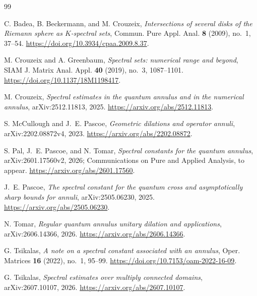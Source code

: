 \documentclass[11pt]{article}
\theoremstyle{definition}
\theoremstyle{remark}
\begin{document}
\begin{thebibliography}{99}

C. Badea, B. Beckermann, and M. Crouzeix,
\emph{Intersections of several disks of the Riemann sphere as
\(K\)-spectral sets},
Commun. Pure Appl. Anal. \textbf{8} (2009), no.~1, 37--54.
\url{https://doi.org/10.3934/cpaa.2009.8.37}.

M. Crouzeix and A. Greenbaum,
\emph{Spectral sets: numerical range and beyond},
SIAM J. Matrix Anal. Appl. \textbf{40} (2019), no.~3,
1087--1101.
\url{https://doi.org/10.1137/18M1198417}.

M. Crouzeix,
\emph{Spectral estimates in the quantum annulus and in the numerical
annulus},
arXiv:2512.11813, 2025.
\url{https://arxiv.org/abs/2512.11813}.

S. McCullough and J.~E. Pascoe,
\emph{Geometric dilations and operator annuli},
arXiv:2202.08872v4, 2023.
\url{https://arxiv.org/abs/2202.08872}.

S. Pal, J.~E. Pascoe, and N. Tomar,
\emph{Spectral constants for the quantum annulus},
arXiv:2601.17560v2, 2026; Communications on Pure and Applied
Analysis, to appear.
\url{https://arxiv.org/abs/2601.17560}.

J.~E. Pascoe,
\emph{The spectral constant for the quantum cross and asymptotically
sharp bounds for annuli},
arXiv:2505.06230, 2025.
\url{https://arxiv.org/abs/2505.06230}.

N. Tomar,
\emph{Regular quantum annulus unitary dilation and applications},
arXiv:2606.14366, 2026.
\url{https://arxiv.org/abs/2606.14366}.

G. Tsikalas,
\emph{A note on a spectral constant associated with an annulus},
Oper. Matrices \textbf{16} (2022), no.~1, 95--99.
\url{https://doi.org/10.7153/oam-2022-16-09}.

G. Tsikalas,
\emph{Spectral estimates over multiply connected domains},
arXiv:2607.10107, 2026.
\url{https://arxiv.org/abs/2607.10107}.

\end{thebibliography}
\end{document}
